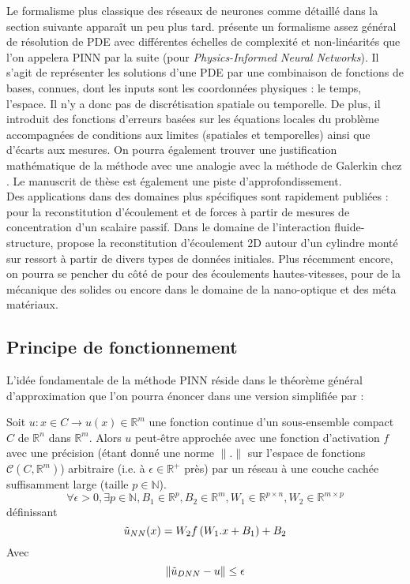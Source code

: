 Le formalisme plus classique des réseaux de neurones comme détaillé dans la section suivante apparaît un peu plus tard. \cite{raissiPhysicsinformedNeuralNetworks2019} présente un formalisme assez général de résolution de PDE avec différentes échelles de complexité et non-linéarités que l'on appelera PINN par la suite (pour \textit{Physics-Informed Neural Networks}). Il s'agit de représenter les solutions d'une PDE par une combinaison de fonctions de bases, connues, dont les inputs sont les coordonnées physiques : le temps, l'espace. Il n'y a donc pas de discrétisation spatiale ou temporelle. De plus, il introduit des fonctions d'erreurs basées sur les équations locales du problème accompagnées de conditions aux limites (spatiales et temporelles) ainsi que d'écarts aux mesures. On pourra également trouver une justification mathématique de la méthode avec une analogie avec la méthode de Galerkin chez \cite{al-aradiSolvingNonlinearHighDimensional}. Le manuscrit de thèse \cite{rudyComputationalMethodsSystem2019} est également une piste d'approfondissement.\\

Des applications dans des domaines plus spécifiques sont rapidement publiées : \cite{raissiHiddenFluidMechanics2018} pour la reconstitution d'écoulement et de forces à partir de mesures de concentration d'un scalaire passif. Dans le domaine de l'interaction fluide-structure, \cite{raissiDeepLearningVortexinduced2019a} propose la reconstitution d'écoulement 2D autour d'un cylindre monté sur ressort à partir de divers types de données initiales. Plus récemment encore, on pourra se pencher du côté de \cite{maoPhysicsinformedNeuralNetworks2020} pour des écoulements hautes-vitesses, \cite{haghighatDeepLearningFramework2020,luExtractionMechanicalProperties2020} pour de la mécanique des solides ou encore \cite{chenPhysicsinformedNeuralNetworks2020} dans le domaine de la nano-optique et des méta matériaux.\


\subsection{Principe de fonctionnement}

L'idée fondamentale de la méthode PINN réside dans le théorème général d'approximation \cite{hornikMultilayerFeedforwardNetworks1989} que l'on pourra énoncer dans une version simplifiée par : 

\begin{theorem}
Soit $u : x\in  C \rightarrow u(x) \in \mathbb{R}^m$ une fonction continue d'un sous-ensemble compact $C$ de $\mathbb{R}^n$ dans $\mathbb{R}^m$. Alors $u$ peut-être approchée avec une fonction d'activation $f$ avec une précision (étant donné une norme $\|.\|$ sur l'espace de fonctions $\mathcal{C}(C,\mathbb{R}^m)$) arbitraire (i.e. à $\epsilon \in \mathbb{R}^+$ près) par un réseau à une couche cachée suffisamment large (taille $p\in \mathbb{N}$).
$$ \forall \epsilon > 0, \exists p\in \mathbb{N}, B_1 \in \mathbb{R}^p, B_2 \in \mathbb{R}^m, W_1 \in \mathbb{R}^{p\times n}, W_2 \in \mathbb{R}^{m \times p} $$
définissant
$$ \Tilde{u}_{NN} (x) = W_2 f\left( W_1 . x + B_1  \right) + B_2 $$
Avec 
$$ \| \Tilde{u}_{DNN} - u \| \leq \epsilon $$
\end{theorem}

